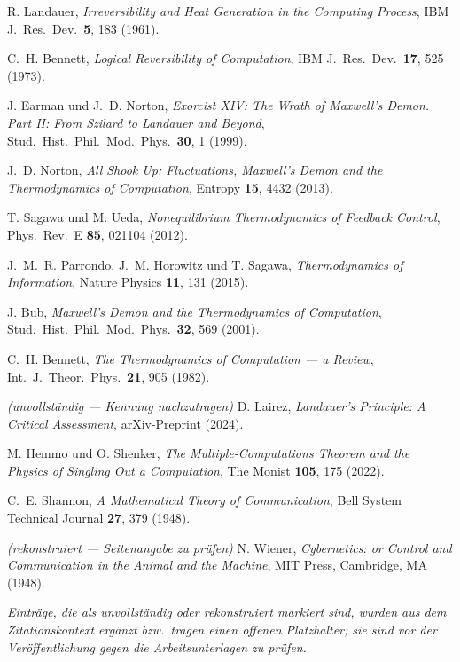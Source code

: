 \documentclass[11pt,a4paper]{article}
\theoremstyle{ffgft}
\begin{document}
\begingroup
\small
\begin{description}[leftmargin=3.2em,style=sameline,itemsep=0.3em]

\item[{[B1]}] R. Landauer, \emph{Irreversibility and Heat Generation in the
Computing Process}, IBM J.\ Res.\ Dev.\ \textbf{5}, 183 (1961).

\item[{[B2]}] C.~H. Bennett, \emph{Logical Reversibility of Computation}, IBM J.\
Res.\ Dev.\ \textbf{17}, 525 (1973).

\item[{[B3]}] J. Earman und J.~D. Norton, \emph{Exorcist XIV: The Wrath of
Maxwell's Demon. Part II: From Szilard to Landauer and Beyond}, Stud.\ Hist.\
Phil.\ Mod.\ Phys.\ \textbf{30}, 1 (1999).

\item[{[B4]}] J.~D. Norton, \emph{All Shook Up: Fluctuations, Maxwell's Demon and
the Thermodynamics of Computation}, Entropy \textbf{15}, 4432 (2013).

\item[{[B5]}] T. Sagawa und M. Ueda, \emph{Nonequilibrium Thermodynamics of
Feedback Control}, Phys.\ Rev.\ E \textbf{85}, 021104 (2012).

\item[{[B6]}] J.~M.~R. Parrondo, J.~M. Horowitz und T. Sagawa,
\emph{Thermodynamics of Information}, Nature Physics \textbf{11}, 131 (2015).

\item[{[B7]}] J. Bub, \emph{Maxwell's Demon and the Thermodynamics of
Computation}, Stud.\ Hist.\ Phil.\ Mod.\ Phys.\ \textbf{32}, 569 (2001).

\item[{[B8]}] C.~H. Bennett, \emph{The Thermodynamics of Computation --- a
Review}, Int.\ J.\ Theor.\ Phys.\ \textbf{21}, 905 (1982).

\item[{[B9]}] \emph{(unvollständig --- Kennung nachzutragen)} D. Lairez,
\emph{Landauer's Principle: A Critical Assessment}, arXiv-Preprint (2024).

\item[{[B10]}] M. Hemmo und O. Shenker, \emph{The Multiple-Computations Theorem
and the Physics of Singling Out a Computation}, The Monist \textbf{105}, 175
(2022).

\item[{[B11]}] C.~E. Shannon, \emph{A Mathematical Theory of Communication}, Bell
System Technical Journal \textbf{27}, 379 (1948).

\item[{[B12]}] \emph{(rekonstruiert --- Seitenangabe zu prüfen)} N. Wiener,
\emph{Cybernetics: or Control and Communication in the Animal and the Machine},
MIT Press, Cambridge, MA (1948).

\end{description}
\endgroup

\vspace{1em}
\noindent
{\small\itshape Einträge, die als \emph{unvollständig} oder \emph{rekonstruiert}
markiert sind, wurden aus dem Zitationskontext ergänzt bzw.\ tragen einen
offenen Platzhalter; sie sind vor der Veröffentlichung gegen die
Arbeitsunterlagen zu prüfen.}
\end{document}
